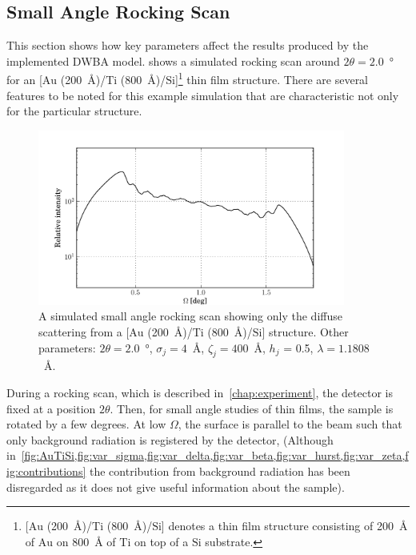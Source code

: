 \documentclass[10pt,twoside, b5paper,pdftex]{report}
\newcommand{\chem}[1]{\ensuremath{\mathrm{#1}}}
\begin{document}
\subsection{Small Angle Rocking Scan\label{sec:SARS}}
This section shows how key parameters affect the results produced by the implemented DWBA model.  shows a simulated rocking scan around $2\theta = 2.0$~\si{\degree} for an [\chem{Au} (\SI{200}{\angstrom})/\chem{Ti} (\SI{800}{\angstrom})/\chem{Si}]\footnote{[\chem{Au} (\SI{200}{\angstrom})/\chem{Ti} (\SI{800}{\angstrom})/\chem{Si}] denotes a thin film structure consisting of \SI{200}{\angstrom} of \chem{Au} on \SI{800}{\angstrom} of \chem{Ti} on top of a \chem{Si} substrate.} thin film structure. There are several features to be noted for this example simulation that are characteristic not only for the particular structure.  
\begin{figure}[htbp]
	\begin{center}
		\includegraphics[width=0.9\textwidth]{figures/AuTiSi.pdf}
	\end{center}
	\caption{A simulated small angle rocking scan showing only the diffuse scattering from a [\chem{Au} (\SI{200}{\angstrom})/\chem{Ti} (\SI{800}{\angstrom})/\chem{Si}] structure. Other parameters: $2\theta = 2.0$~\si{\degree}, $\sigma_j = 4$~\si{\angstrom}, $\zeta_j = 400$~\si{\angstrom}, $h_j$ = 0.5, $\lambda = 1.1808$~\si{\angstrom}.\label{fig:AuTiSi}}
\end{figure}
During a rocking scan, which is described in~\cref{chap:experiment}, the detector is fixed at a position $2\theta$. Then, for small angle studies of thin films, the sample is rotated by a few degrees. At low $\Omega$, the surface is parallel to the beam such that only background radiation
is registered by the detector, (Although in~\cref{fig:AuTiSi,fig:var_sigma,fig:var_delta,fig:var_beta,fig:var_hurst,fig:var_zeta,fig:contributions} the contribution from background radiation has been disregarded as it does not give useful information about the sample). 
\end{document}
